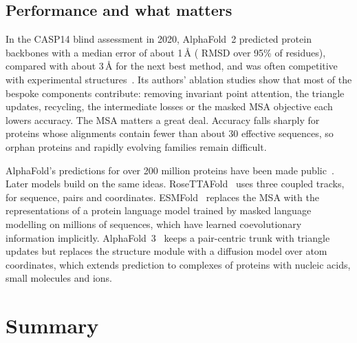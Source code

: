 \subsection{Performance and what matters}

In the CASP14 blind assessment in 2020, AlphaFold~2 predicted protein backbones with a median error of about 1\,\AA{} (\Ca{} RMSD over 95\% of residues), compared with about 3\,\AA{} for the next best method, and was often competitive with experimental structures~\citep{jumper2021}. Its authors' ablation studies show that most of the bespoke components contribute: removing invariant point attention, the triangle updates, recycling, the intermediate losses or the masked MSA objective each lowers accuracy. The MSA matters a great deal. Accuracy falls sharply for proteins whose alignments contain fewer than about 30 effective sequences, so orphan proteins and rapidly evolving families remain difficult.

AlphaFold's predictions for over 200 million proteins have been made public~\citep{varadi2022}. Later models build on the same ideas. RoseTTAFold~\citep{baek2021} uses three coupled tracks, for sequence, pairs and coordinates. ESMFold~\citep{lin2023} replaces the MSA with the representations of a protein language model trained by masked language modelling on millions of sequences, which have learned coevolutionary information implicitly. AlphaFold~3~\citep{abramson2024} keeps a pair-centric trunk with triangle updates but replaces the structure module with a diffusion model over atom coordinates, which extends prediction to complexes of proteins with nucleic acids, small molecules and ions.

\section{Summary}

